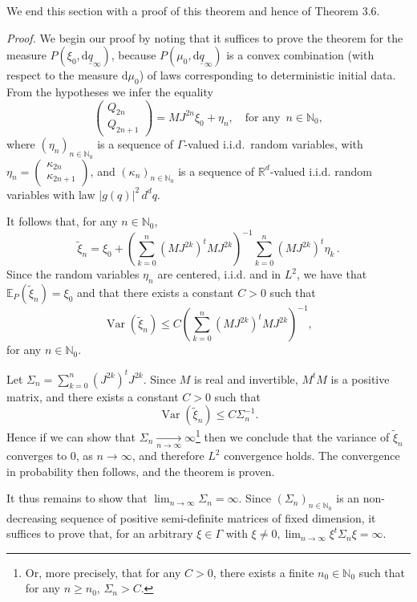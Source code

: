 \documentclass[12pt]{article}
\begin{document}
We end this section with a proof of this theorem and hence of Theorem 3.6. 

\noindent \textit{Proof.} We begin our proof by noting that it suffices to prove the theorem for the measure 
$P(\xi_0,\text{d}\underline{q}_\infty)$, because $P(\mu_0,\text{d}\underline{q}_\infty)$ is a convex combination 
(with respect to the measure $\text{d}\mu_0$) of laws corresponding to deterministic initial data.
	From the hypotheses we infer the equality
	$$\begin{pmatrix}Q_{2n} \\ Q_{2n+1}\end{pmatrix}= MJ^{2n} \xi_0 + \eta_n, \quad \text{for any }\,n\in \mathbb N_0, $$
where $(\eta_n)_{n\in \mathbb N_0}$ is a sequence of $\Gamma$-valued i.i.d.~random variables, with 
$\eta_n=\begin{pmatrix}\kappa_{2n} \\ \kappa_{2n+1}\end{pmatrix}$, and $(\kappa_n)_{n\in \mathbb N_0}$ 
is a sequence of $\mathbb R^d$-valued i.i.d. random variables with law $\vert g(q)\vert^{2}\, d^{d}q$.

	It follows that, for any $n\in \mathbb N_0$,
	$$\tilde \xi_n= \xi_0+\left(\sum_{k=0}^n(MJ^{2k})^{t}MJ^{2k}\right)^{-1}\sum_{k=0}^n (MJ^{2k})^{t}\eta_k\,.$$
	Since the random variables $\eta_n$ are centered, i.i.d. and in $L^2$, we have that $\mathbb E_P(\tilde \xi_n)=\xi_0$ and that there exists a constant $C>0$ such that 
	$$\operatorname{Var}(\tilde \xi_n)\leq C\left(\sum_{k=0}^n(MJ^{2k})^{t}MJ^{2k}\right)^{-1},$$
	for any $n\in \mathbb N_0$.

	Let $\Sigma_n=\sum_{k=0}^n (J^{2k})^{t}J^{2k}$. Since $M$ is real and invertible, $M^{t}M$ is a positive matrix, 
	and there exists a constant $C>0$ such that
	$$\operatorname{Var}(\tilde \xi_n)\leq C \Sigma_n^{-1}.$$
	Hence if we can show that $\Sigma_n \underset{n\to\infty}{\rightarrow} \infty$\footnote{Or, more precisely, that for any $C>0$, there exists a finite $n_0\in \mathbb N_0$ such that for any $n\geq n_0$, $\Sigma_n> C$.} then we conclude that
	the variance of $\tilde{\xi}_n$ converges to 0, as $n\rightarrow \infty$, and therefore $L^2$ convergence holds. 
	The convergence in probability then follows, and the theorem is proven.	
	
	It thus remains to show that $\lim_{n\to\infty}\Sigma_n=\infty$. Since $(\Sigma_n)_{n \in \mathbb{N}_0}$ is an 
	non-decreasing sequence of positive semi-definite matrices of fixed dimension, it suffices to prove that, for an arbitrary 
	$\xi\in \Gamma$ with $\xi \neq 0, \lim_{n\rightarrow \infty} \xi^t\Sigma_n\xi =\infty$. 
	
\end{document}
